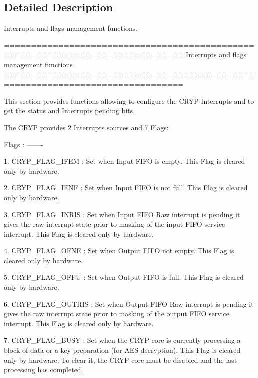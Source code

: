 \subsection{Detailed Description}
Interrupts and flags management functions. \begin{DoxyVerb} ===============================================================================
                   Interrupts and flags management functions
 ===============================================================================  

  This section provides functions allowing to configure the CRYP Interrupts and 
  to get the status and Interrupts pending bits.

  The CRYP provides 2 Interrupts sources and 7 Flags:

  Flags :
  ------- 
                          
     1. CRYP_FLAG_IFEM :  Set when Input FIFO is empty.
                          This Flag is cleared only by hardware.
      
     2. CRYP_FLAG_IFNF :  Set when Input FIFO is not full.
                          This Flag is cleared only by hardware.


     3. CRYP_FLAG_INRIS  : Set when Input FIFO Raw interrupt is pending 
                           it gives the raw interrupt state prior to masking 
                           of the input FIFO service interrupt.
                           This Flag is cleared only by hardware.
     
     4. CRYP_FLAG_OFNE   : Set when Output FIFO not empty.
                           This Flag is cleared only by hardware.
        
     5. CRYP_FLAG_OFFU   : Set when Output FIFO is full.
                           This Flag is cleared only by hardware.
                           
     6. CRYP_FLAG_OUTRIS : Set when Output FIFO Raw interrupt is pending 
                           it gives the raw interrupt state prior to masking 
                           of the output FIFO service interrupt.
                           This Flag is cleared only by hardware.
                               
     7. CRYP_FLAG_BUSY   : Set when the CRYP core is currently processing a 
                           block of data or a key preparation (for AES 
                           decryption).
                           This Flag is cleared only by hardware.
                           To clear it, the CRYP core must be disabled and the 
                           last processing has completed. 


\end{DoxyVerb}
